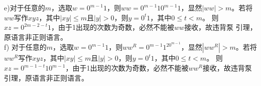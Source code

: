 \begin{solution}
    e)对于任意的$m$，选取$w=0^{m-1}1$，则$ww=0^{m-1}10^{m-1}1$，显然$|ww|>m$。若将
    $ww$写作$xyz$，其中$|xy| \le m$且$|y| > 0$，则$y=0^{t}1$，其中$0 \le t < m$。
    则$xz = 0^{2m-2-t}1$，由于1出现的次数为奇数，必然不能被$ww$接收，故违背泵
    引理，原语言非正则语言。\\
    f) 对于任意的$m$，选取$w=0^{m-1}1$，则$ww^R=0^{m-1}1^20^{m-1}$，显然$|ww^R|>m$。若将
    $ww^R$写作$xyz$，其中$|xy| \le m$且$|y| > 0$，则$y=0^{t}1$，其中$0 \le t < m$。
    则$xz = 0^{m-1-t}10^{m-1}$，由于1出现的次数为奇数，必然不能被$ww^R$接收，故违背泵
    引理，原语言非正则语言。\\
\end{solution}